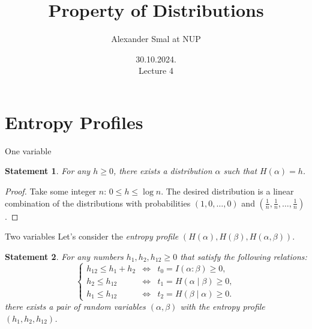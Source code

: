 \documentclass[aspectratio=169]{beamer}
\title{Property of Distributions}
\author{Alexander Smal at NUP}
\date{30.10.2024.\\ Lecture 4}
\newtheorem{statement}{Statement}
\begin{document}
    \begin{frame}[plain]
        \maketitle
    \end{frame}

    \section{Entropy Profiles}
    \begin{frame}{One variable}
		\begin{statement}
		    For any \(h \ge 0\), there exists a distribution \(\alpha\) such that \(H(\alpha) = h\).
		\end{statement}
		\pause
		\begin{proof}
		    Take some integer \(n\): \(0 \le h \le \log n\). The desired distribution is a linear combination of the distributions with probabilities \((1, 0, \dotsc, 0)\) and \((\frac{1}{n}, \frac{1}{n}, \dotsc, \frac{1}{n})\).
		\end{proof}
    \end{frame}

    \begin{frame}{Two variables}
		Let's consider the \emph{entropy profile} \((H(\alpha), H(\beta), H(\alpha, \beta))\).
		\begin{statement}
		    For any numbers \(h_1, h_2, h_{12} \ge 0\) that satisfy the following relations:
		\[
		    \left\{
		    \begin{array}{lll}
		        h_{12} \le h_1 + h_2 & \iff & t_0 = I(\alpha:\beta) \ge 0,\\
		        h_{2} \le h_{12}     & \iff & t_1 = H(\alpha \mid \beta) \ge 0,\\
		        h_{1} \le h_{12}     & \iff & t_2 = H(\beta \mid \alpha) \ge 0.
		    \end{array}
		    \right.
		\]
		    there exists a pair of random variables \((\alpha, \beta)\) with the entropy profile \((h_1, h_2, h_{12})\).
		\end{statement}
    \end{frame}
\end{document}
